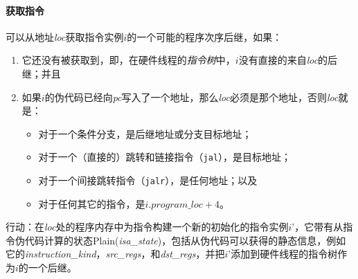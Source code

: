 \paragraph{获取指令}\label{omm:fetch}
可以从地址{\it loc}获取指令实例$i$的一个可能的程序次序后继，如果：
\begin{enumerate}
\item 它还没有被获取到，即，在硬件线程的{\it 指令树}中，$i$没有直接的来自{\it loc}的后继；并且 %
\item 如果$i$的伪代码已经向{\em pc}写入了一个地址，那么{\it loc}必须是那个地址，否则{\it loc}就是：  %
  \begin{itemize}
  \item 对于一个条件分支，是后继地址或分支目标地址；  %
  \item 对于一个（直接的）跳转和链接指令（{\tt jal}），是目标地址；  %
  \item 对于一个间接跳转指令（{\tt jalr}），是任何地址；以及  %
  \item 对于任何其它的指令，是$i.\textit{program\_loc}+4$。 %
  \end{itemize}
\end{enumerate}

行动：在{\it loc}处的程序内存中为指令构建一个新的初始化的指令实例$i’$，它带有从指令伪代码计算的状态{\sc Plain}({\it isa\_state})，包括从伪代码可以获得的静态信息，例如它的{\it instruction\_kind}，{\it src\_regs}，和{\it dst\_regs}，并把$i’$添加到硬件线程的指令树作为$i$的一个后继。


